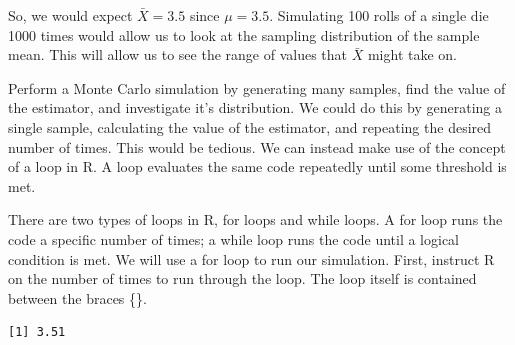 \documentclass[]{book}
\newenvironment{Shaded}{\begin{snugshade}}{\end{snugshade}}
\newcommand{\CommentTok}[1]{\textcolor[rgb]{0.56,0.35,0.01}{\textit{#1}}}
\newcommand{\ControlFlowTok}[1]{\textcolor[rgb]{0.13,0.29,0.53}{\textbf{#1}}}
\newcommand{\DataTypeTok}[1]{\textcolor[rgb]{0.13,0.29,0.53}{#1}}
\newcommand{\DecValTok}[1]{\textcolor[rgb]{0.00,0.00,0.81}{#1}}
\newcommand{\FloatTok}[1]{\textcolor[rgb]{0.00,0.00,0.81}{#1}}
\newcommand{\KeywordTok}[1]{\textcolor[rgb]{0.13,0.29,0.53}{\textbf{#1}}}
\newcommand{\NormalTok}[1]{#1}
\newcommand{\OperatorTok}[1]{\textcolor[rgb]{0.81,0.36,0.00}{\textbf{#1}}}
\newcommand{\StringTok}[1]{\textcolor[rgb]{0.31,0.60,0.02}{#1}}
\begin{document}
So, we would expect \(\bar X = 3.5\) since \(\mu = 3.5\). Simulating 100 rolls of a single die 1000 times would allow us to look at the sampling distribution of the sample mean. This will allow us to see the range of values that \(\bar X\) might take on.

Perform a Monte Carlo simulation by generating many samples, find the value of the estimator, and investigate it's distribution. We could do this by generating a single sample, calculating the value of the estimator, and repeating the desired number of times. This would be tedious. We can instead make use of the concept of a loop in R. A loop evaluates the same code repeatedly until some threshold is met.

There are two types of loops in R, for loops and while loops. A for loop runs the code a specific number of times; a while loop runs the code until a logical condition is met. We will use a for loop to run our simulation. First, instruct R on the number of times to run through the loop. The loop itself is contained between the braces \{\}.

\begin{Shaded}
\end{Shaded}

\begin{verbatim}
[1] 3.51
\end{verbatim}

\begin{Shaded}
\end{Shaded}
\end{document}
